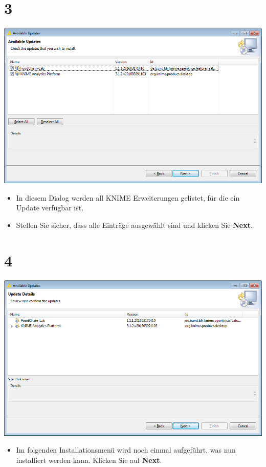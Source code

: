 \documentclass{beamer}
\begin{document}
\section{3}
\begin{frame}
	\begin{center}
  		\includegraphics[height=0.6\textheight]{3.png}
	\end{center}
	\begin{itemize}
		\item In diesem Dialog werden all KNIME Erweiterungen gelistet, für die ein Update verfügbar ist.
		\item Stellen Sie sicher, dass alle Einträge ausgewählt sind und klicken Sie \textbf{Next}.
	\end{itemize}
\end{frame}

\section{4}
\begin{frame}
	\begin{center}
  		\includegraphics[height=0.6\textheight]{4.png}
	\end{center}
	\begin{itemize}
		\item Im folgenden Installationsmenü wird noch einmal aufgeführt, was nun installiert werden kann. Klicken Sie auf \textbf{Next}.
	\end{itemize}
\end{frame}
\end{document}
